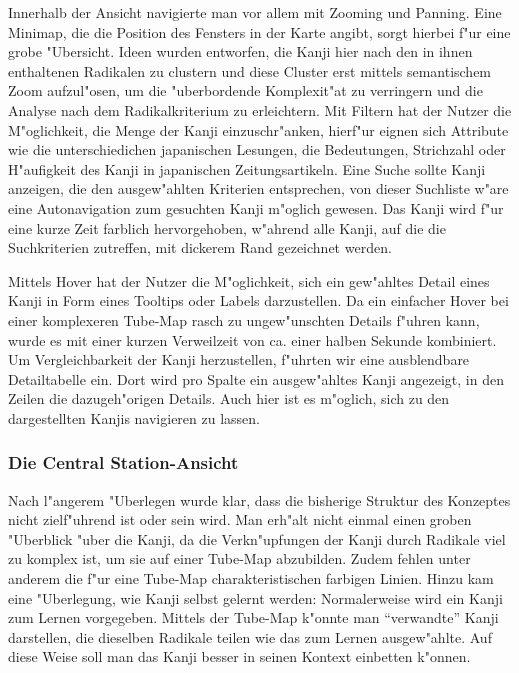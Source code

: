 Innerhalb der Ansicht navigierte man vor allem mit Zooming und Panning. Eine Minimap, die die Position des Fensters in der Karte angibt, sorgt hierbei f"ur eine grobe "Ubersicht. Ideen wurden entworfen, die Kanji hier nach den in ihnen enthaltenen Radikalen zu clustern und diese Cluster erst mittels semantischem Zoom aufzul"osen, um die "uberbordende Komplexit"at zu verringern und die Analyse nach dem Radikalkriterium zu erleichtern. Mit Filtern hat der Nutzer die M"oglichkeit, die Menge der Kanji einzuschr"anken, hierf"ur eignen sich Attribute wie die unterschiedichen japanischen Lesungen, die Bedeutungen, Strichzahl oder H"aufigkeit des Kanji in japanischen Zeitungsartikeln. Eine Suche sollte Kanji anzeigen, die den ausgew"ahlten Kriterien entsprechen, von dieser Suchliste w"are eine Autonavigation zum gesuchten Kanji m"oglich gewesen. Das Kanji wird f"ur eine kurze Zeit farblich hervorgehoben, w"ahrend alle Kanji, auf die die Suchkriterien zutreffen, mit dickerem Rand gezeichnet werden.

Mittels Hover hat der Nutzer die M"oglichkeit, sich ein gew"ahltes Detail eines Kanji in Form eines Tooltips oder Labels darzustellen. Da ein einfacher Hover bei einer komplexeren Tube-Map rasch zu ungew"unschten Details f"uhren kann, wurde es mit einer kurzen Verweilzeit von ca. einer halben Sekunde kombiniert. Um Vergleichbarkeit der Kanji herzustellen, f"uhrten wir eine ausblendbare Detailtabelle ein. Dort wird pro Spalte ein ausgew"ahltes Kanji angezeigt, in den Zeilen die dazugeh"origen Details. Auch hier ist es m"oglich, sich zu den dargestellten Kanjis navigieren zu lassen.


\subsubsection{Die Central Station-Ansicht}
Nach l"angerem "Uberlegen wurde klar, dass die bisherige Struktur des Konzeptes nicht zielf"uhrend ist oder sein wird. Man erh"alt nicht einmal einen groben "Uberblick "uber die Kanji, da die Verkn"upfungen der Kanji durch Radikale viel zu komplex ist, um sie auf einer Tube-Map abzubilden. Zudem fehlen unter anderem die f"ur eine Tube-Map charakteristischen farbigen Linien. Hinzu kam eine "Uberlegung, wie Kanji selbst gelernt werden: Normalerweise wird ein Kanji zum Lernen vorgegeben. Mittels der Tube-Map k"onnte man "`verwandte"' Kanji darstellen, die dieselben Radikale teilen wie das zum Lernen ausgew"ahlte. Auf diese Weise soll man das Kanji besser in seinen Kontext einbetten k"onnen.

